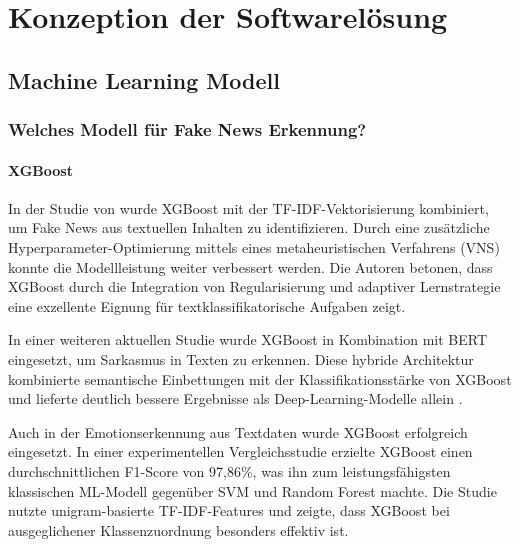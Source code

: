 \chapter{Konzeption der Softwarelösung}
\label{chap:konzeption_der_softwareloesung}

\section{Machine Learning Modell} %

\subsection{Welches Modell für Fake News Erkennung?}



\subsubsection{XGBoost}



In der Studie von \cite{petrovic2024} wurde XGBoost mit der TF-IDF-Vektorisierung kombiniert, 
um Fake News aus textuellen Inhalten zu identifizieren. Durch eine zusätzliche Hyperparameter-Optimierung mittels eines 
metaheuristischen Verfahrens (VNS) konnte die Modellleistung weiter verbessert werden. Die Autoren betonen, 
dass XGBoost durch die Integration von Regularisierung und adaptiver Lernstrategie eine exzellente Eignung für textklassifikatorische 
Aufgaben zeigt.

In einer weiteren aktuellen Studie wurde XGBoost in Kombination mit BERT eingesetzt, um Sarkasmus in Texten zu erkennen. 
Diese hybride Architektur kombinierte semantische Einbettungen mit der Klassifikationsstärke von XGBoost und lieferte deutlich bessere 
Ergebnisse als Deep-Learning-Modelle allein \cite{sharma2025}.

Auch in der Emotionserkennung aus Textdaten wurde XGBoost erfolgreich eingesetzt. 
In einer experimentellen Vergleichsstudie erzielte XGBoost einen durchschnittlichen F1-Score von 97{,}86\%, 
was ihn zum leistungsfähigsten klassischen ML-Modell gegenüber SVM und Random Forest machte\cite{paksoy2024}. 
Die Studie nutzte unigram-basierte TF-IDF-Features und zeigte, dass XGBoost bei ausgeglichener Klassenzuordnung besonders effektiv ist.



